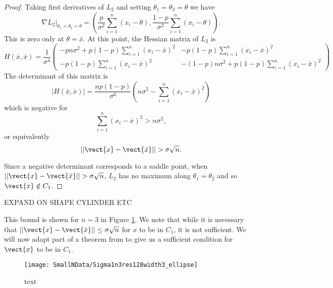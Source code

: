 \begin{proof}
		Taking first derivatives of $L_2$ and setting $\theta_1 = \theta_2 = \theta$ we have
		\begin{equation}
		\left. \nabla L_2 \right|_{\theta_1 = \theta_2 = \theta} = \left(\frac{p}{\sigma^2} \sum_{i=1}^n(x_i - \theta),\frac{1-p}{\sigma^2} \sum_{i=1}^n(x_i - \theta)\right).
		\end{equation}
		This is zero only at $\theta = \bar{x}$. At this point, the Hessian matrix of $L_2$ is
		\begin{equation}
		H(\bar{x},\bar{x}) = \frac{1}{\sigma^4} \begin{pmatrix}
		-p n \sigma^2 + p(1-p) \sum_{i=1}^n (x_i - \bar{x})^2 &  -p(1-p) \sum_{i=1}^n (x_i - \bar{x})^2\\
		 -p(1-p) \sum_{i=1}^n (x_i - \bar{x})^2 & -(1-p) n \sigma^2 + p(1-p) \sum_{i=1}^n (x_i - \bar{x})^2
		\end{pmatrix}
		\end{equation}
		The determinant of this matrix is
		\begin{equation}
		|H(\bar{x},\bar{x})| = \frac{np(1-p)}{\sigma^6} \left(n\sigma^2 - \sum_{i=1}^n (x_i - \bar{x})^2 \right)
		\end{equation}
		which is negative for 
		\begin{equation}
		\sum_{i=1}^n (x_i - \bar{x})^2 > n \sigma^2,
		\end{equation}
		or equivalently
		\begin{equation}
		||\vect{x} - \vect{\bar{x}}|| > \sigma \sqrt{n}.
		\end{equation}
		
		Since a negative determinant corresponds to a saddle point, when $||\vect{x} - \vect{\bar{x}}|| > \sigma \sqrt{n}$, $L_2$ has no maximum along $\theta_1 = \theta_2$ and so $\vect{x} \notin C_1$.
	\end{proof}

	EXPAND ON SHAPE CYLINDER ETC

	This bound is shown for $n=3$ in Figure \ref{fig:C1bound}. We note that while it is necessary that $||\vect{x} - \vect{\bar{x}}|| \leq \sigma \sqrt{n}$ for $x$ to be in $C_1$, it is not sufficient. We will now adapt part of a theorem from \cite{Lindsay1983a-he} \cite{Lindsay1983a-he} to give us a sufficient condition for $\vect{x}$ to be in $C_1$.

	\begin{figure}[ht]
		\centering
		\texttt{[image: SmallNData/Sigma1n3res128width3\_ellipse]}
		\caption{text}
		\label{fig:C1bound}
	\end{figure}

